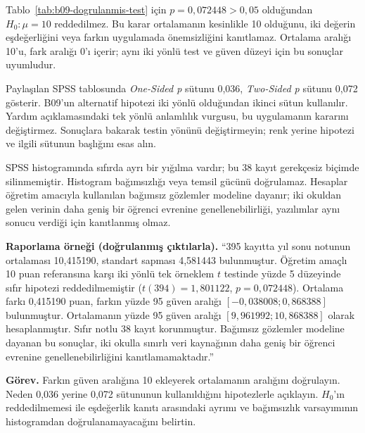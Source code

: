 \begin{outputguidebox}
Tablo~\ref{tab:b09-dogrulanmis-test} için $p=0{,}072448>0{,}05$
olduğundan $H_0:\mu=10$ reddedilmez. Bu karar ortalamanın kesinlikle
10 olduğunu, iki değerin eşdeğerliğini veya farkın uygulamada
önemsizliğini kanıtlamaz. Ortalama aralığı 10'u, fark aralığı 0'ı
içerir; aynı iki yönlü test ve güven düzeyi için bu sonuçlar uyumludur.

Paylaşılan SPSS tablosunda \emph{One-Sided p} sütunu 0,036,
\emph{Two-Sided p} sütunu 0,072 gösterir. B09'un alternatif hipotezi
iki yönlü olduğundan ikinci sütun kullanılır. Yardım açıklamasındaki
tek yönlü anlamlılık vurgusu, bu uygulamanın kararını değiştirmez.
Sonuçlara bakarak testin yönünü değiştirmeyin; renk yerine hipotezi
ve ilgili sütunun başlığını esas alın.

SPSS histogramında sıfırda ayrı bir yığılma vardır; bu 38 kayıt
gerekçesiz biçimde silinmemiştir. Histogram bağımsızlığı veya temsil
gücünü doğrulamaz. Hesaplar öğretim amacıyla kullanılan bağımsız
gözlemler modeline dayanır; iki okuldan gelen verinin daha geniş bir
öğrenci evrenine genellenebilirliği, yazılımlar aynı sonucu verdiği
için kanıtlanmış olmaz.
\end{outputguidebox}

\textbf{Raporlama örneği (doğrulanmış çıktılarla).}
``395 kayıtta yıl sonu notunun ortalaması 10,415190, standart sapması
4,581443 bulunmuştur. Öğretim amaçlı 10 puan referansına karşı iki
yönlü tek örneklem $t$ testinde yüzde 5 düzeyinde sıfır hipotezi
reddedilmemiştir ($t(394)=1{,}801122$, $p=0{,}072448$).
Ortalama farkı 0,415190 puan, farkın yüzde 95 güven aralığı
$[-0{,}038008;0{,}868388]$ bulunmuştur. Ortalamanın yüzde 95 güven
aralığı $[9{,}961992;10{,}868388]$ olarak hesaplanmıştır. Sıfır notlu
38 kayıt korunmuştur. Bağımsız gözlemler modeline dayanan bu sonuçlar,
iki okulla sınırlı veri kaynağının daha geniş bir öğrenci evrenine
genellenebilirliğini kanıtlamamaktadır.''


\textbf{Görev.} Farkın güven aralığına 10 ekleyerek ortalamanın
aralığını doğrulayın. Neden 0,036 yerine 0,072 sütununun kullanıldığını
hipotezlerle açıklayın. $H_0$'ın reddedilmemesi ile eşdeğerlik
kanıtı arasındaki ayrımı ve bağımsızlık varsayımının histogramdan
doğrulanamayacağını belirtin.